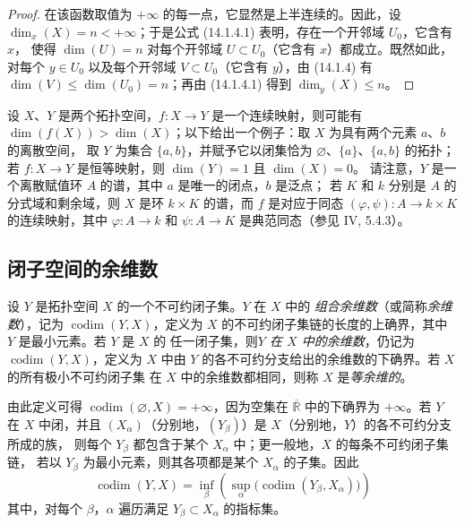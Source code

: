 \begin{proof}
在该函数取值为 $+\infty$ 的每一点，它显然是上半连续的。因此，设
$\dim_x(X)=n<+\infty$；于是公式 (14.1.4.1) 表明，存在一个开邻域 $U_0$，它含有 $x$，
使得 $\dim(U)=n$ 对每个开邻域 $U\subset U_0$（它含有 $x$）都成立。既然如此，
对每个 $y\in U_0$ 以及每个开邻域 $V\subset U_0$（它含有 $y$），由 (14.1.4) 有
$\dim(V)\leq\dim(U_0)=n$；再由 (14.1.4.1) 得到 $\dim_y(X)\leq n$。
\end{proof}

\begin{remark}[14.1.12]
\label{0.14.1.12-fr}
设 $X$、$Y$ 是两个拓扑空间，$f:X\to Y$ 是一个连续映射，则可能有
$\dim(f(X))>\dim(X)$；以下给出一个例子：取 $X$ 为具有两个元素 $a$、$b$ 的离散空间，
取 $Y$ 为集合 $\{a,b\}$，并赋予它以闭集恰为 $\varnothing$、$\{a\}$、$\{a,b\}$
的拓扑；若 $f:X\to Y$ 是恒等映射，则 $\dim(Y)=1$ 且 $\dim(X)=0$。
请注意，$Y$ 是一个离散赋值环 $A$ 的谱，其中 $a$ 是唯一的闭点，$b$ 是泛点；
若 $K$ 和 $k$ 分别是 $A$ 的分式域和剩余域，则 $X$ 是环 $k\times K$ 的谱，而 $f$
是对应于同态 $(\varphi,\psi):A\to k\times K$ 的连续映射，其中
$\varphi:A\to k$ 和 $\psi:A\to K$ 是典范同态（参见 IV, 5.4.3）。
\end{remark}


\subsection{闭子空间的余维数}
\label{subsection:0.14.2-fr}

\begin{definition}[14.2.1]
\label{0.14.2.1-fr}
设 $Y$ 是拓扑空间 $X$ 的一个不可约闭子集。$Y$ 在 $X$ 中的
\emph{组合余维数}（或简称\emph{余维数}），记为 $\operatorname{codim}(Y,X)$，定义为
$X$ 的不可约闭子集链的长度的上确界，其中 $Y$ 是最小元素。若 $Y$ 是 $X$ 的
任一闭子集，则\emph{$Y$ 在 $X$ 中的余维数}，仍记为 $\operatorname{codim}(Y,X)$，定义为
$X$ 中由 $Y$ 的各不可约分支给出的余维数的下确界。若 $X$ 的所有极小不可约闭子集
在 $X$ 中的余维数都相同，则称 $X$ 是\emph{等余维的}。
\end{definition}

由此定义可得 $\operatorname{codim}(\varnothing,X)=+\infty$，因为空集在
$\overline{\mathbb R}$ 中的下确界为 $+\infty$。若 $Y$ 在 $X$ 中闭，并且
$(X_\alpha)$（分别地，$(Y_\beta)$）是 $X$（分别地，$Y$）的各不可约分支所成的族，
则每个 $Y_\beta$ 都包含于某个 $X_\alpha$ 中；更一般地，$X$ 的每条不可约闭子集链，
若以 $Y_\beta$ 为最小元素，则其各项都是某个 $X_\alpha$ 的子集。因此
\[
  \operatorname{codim}(Y,X)=
  \inf_\beta\left(\sup_\alpha
  \bigl(\operatorname{codim}(Y_\beta,X_\alpha)\bigr)\right)
  \tag{14.2.1.1}\label{0.14.2.1.1-fr}
\]
其中，对每个 $\beta$，$\alpha$ 遍历满足 $Y_\beta\subset X_\alpha$ 的指标集。

